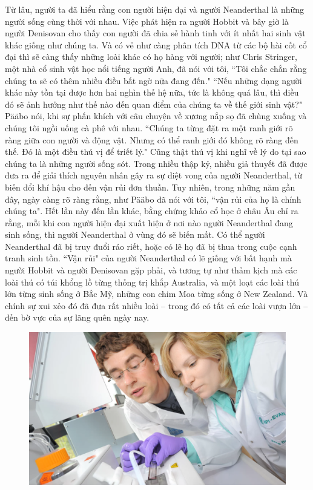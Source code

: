 \begin{multicols}{2}
	\vskip 0.1cm
	Từ lâu, người ta đã hiểu rằng con người hiện đại và người Neanderthal là những người sống cùng thời với nhau. Việc phát hiện ra người Hobbit và bây giờ là người Denisovan cho thấy con người đã chia sẻ hành tinh với ít nhất hai sinh vật khác giống như chúng ta. Và có vẻ như càng phân tích DNA từ các bộ hài cốt cổ đại thì sẽ càng thấy những loài khác có họ hàng với người; như Chris Stringer, một nhà cổ sinh vật học nổi tiếng người Anh, đã nói với tôi, ``Tôi chắc chắn rằng chúng ta sẽ có thêm nhiều điều bất ngờ nữa đang đến."
	\vskip 0.1cm
	``Nếu những dạng người khác này tồn tại được hơn hai nghìn thế hệ nữa, tức là không quá lâu, thì điều đó sẽ ảnh hưởng như thế nào đến quan điểm của chúng ta về thế giới sinh vật?" Pääbo nói, khi sự phấn khích với câu chuyện về xương nắp sọ đã chùng xuống và chúng tôi ngồi uống cà phê với nhau. ``Chúng ta từng đặt ra một ranh giới rõ ràng giữa con người và động vật. Nhưng có thể ranh giới đó không rõ ràng đến thế. Đó là một điều thú vị để triết lý." Cũng thật thú vị khi nghĩ về lý do tại sao chúng ta là những người sống sót.
	\vskip 0.1cm
	Trong nhiều thập kỷ, nhiều giả thuyết đã được đưa ra để giải thích nguyên nhân gây ra sự diệt vong của người Neanderthal, từ biến đổi khí hậu cho đến vận rủi đơn thuần. Tuy nhiên, trong những năm gần đây, ngày càng rõ ràng rằng, như Pääbo đã nói với tôi, ``vận rủi của họ là chính chúng ta". Hết lần này đến lần khác, bằng chứng khảo cổ học ở châu Âu chỉ ra rằng, mỗi khi con người hiện đại xuất hiện ở nơi nào người Neanderthal đang sinh sống, thì người Neanderthal ở vùng đó sẽ biến mất. Có thể người Neanderthal đã bị truy đuổi ráo riết, hoặc có lẽ họ đã bị thua trong cuộc cạnh tranh sinh tồn. ``Vận rủi" của người Neanderthal có lẽ giống với bất hạnh mà người Hobbit và người Denisovan gặp phải, và tương tự như thảm kịch mà các loài thú có túi khổng lồ từng thống trị khắp Australia, và một loạt các loài thú lớn từng sinh sống ở Bắc Mỹ, những con chim Moa từng sống ở New Zealand. Và chính sự xui xẻo đó đã đưa rất nhiều loài -- trong đó có tất cả các loài vượn lớn -- đến bờ vực của sự lãng quên ngày nay.
	\begin{figure}[H]
		\vspace*{-5pt}
		\centering
		\captionsetup{labelformat= empty, justification=centering}
		\includegraphics[width= 1\linewidth]{7}

\end{figure}
\end{multicols}
